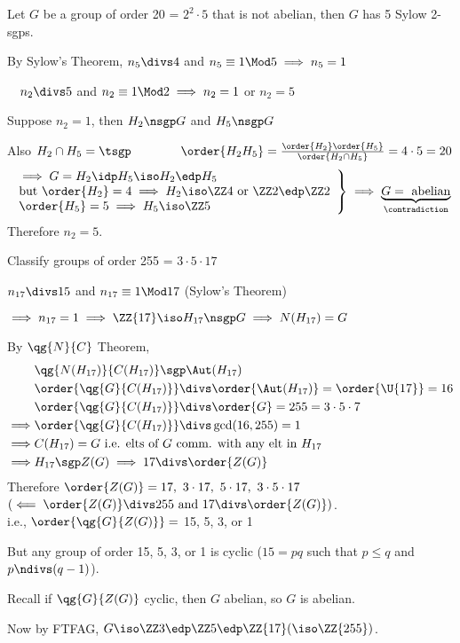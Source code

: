 \begin{example}
    Let \(G\) be a group of order 20 = \(2^2\cdot 5\) that is not abelian, then \(G\) has 5 Sylow 2-sgps.

    By Sylow's Theorem, \(n_5\divs 4\) and \(n_5\equiv 1\Mod 5 \implies n_5=1 \)

    \qquad\qquad\qquad\qquad\quad\ \ \(n_2 \divs 5\) and \(n_2 \equiv 1\Mod 2\implies n_2=1\) or \(n_2=5\)

    Suppose \(n_2 = 1\), then \(H_2\nsgp G\) and \(H_5\nsgp G\)

    Also \(H_2\cap H_5 = \tsgp \qquad\qquad \order{H_2H_5} = \frac{\order{H_2}\order{H_5}}{\order{H_2\cap H_5}} = 4\cdot 5 = 20\)
    \begin{align*}
        \left.
        \begin{array}{l}
            \implies G = H_2\idp H_5 \iso H_2\edp H_5 \\
            \text{but }\order{H_2} = 4 \implies H_2\iso\ZZ 4 \text{ or } \ZZ 2\edp\ZZ 2 \\
            \order{H_5} = 5 \implies H_5\iso\ZZ 5
        \end{array}
        \right\} \implies \underbrace{G =\text{ abelian}}_{\contradiction}
    \end{align*}
    Therefore \(n_2 = 5\).
\end{example}

\begin{example}
Classify groups of order 255 = \(3\cdot 5\cdot 17\)

\(n_{17}\divs 15\) and \(n_{17}\equiv 1\Mod 17\) (Sylow's Theorem)

\(\implies n_{17} = 1 \implies \ZZ{17}\iso H_{17}\nsgp G \implies N(H_{17}) = G\)

By \(\qg{N}{C}\) Theorem, \begin{align*}
  &\qg{N(H_{17})}{C(H_{17})} \sgp \Aut(H_{17})  \\
  &\order{\qg{G}{C(H_{17})}} \divs \order{\Aut(H_{17})} =\order{\U{17}}  = 16 \\
  &\order{\qg{G}{C(H_{17})}} \divs \order{G} =255 = 3\cdot 5\cdot 7 \\
  \implies &\order{\qg{G}{C(H_{17})}} \divs \gcd(16,255) = 1 \\
  \implies &C(H_{17}) = G \text{ i.e. elts of \(G\) comm. with any elt in \(H_{17}\)} \\
  \implies &H_{17} \sgp Z(G) \implies 17\divs \order{Z(G)}
\end{align*}
Therefore \(\order{Z(G)} = 17,\ 3\cdot 17,\ 5\cdot 17,\ 3\cdot 5\cdot 17\) \(\left(\impliedby \order{Z(G)}\divs 255 \text{ and }17\divs \order{Z(G)}\right)\). \\
i.e., \(\order{\qg{G}{Z(G)}} =\) 15, 5, 3, or 1

But any group of order 15, 5, 3, or 1 is cyclic (\(15 = pq\) such that \(p\leq q\) and \(p\ndivs (q-1)\)).

Recall if \(\qg{G}{Z(G)} \) cyclic, then \(G\) abelian, so \(G\) is abelian.

Now by FTFAG, \(G\iso \ZZ 3 \edp \ZZ 5\edp \ZZ{17} (\iso \ZZ{255})\).
\end{example}

